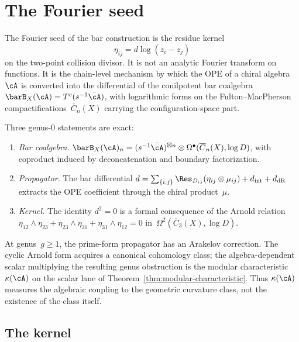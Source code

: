 \chapter{The Fourier seed}\label{ch:fourier-seed}



The Fourier seed of the bar construction is the residue kernel
\[
\eta_{ij}=d\log(z_i-z_j)
\]
on the two-point collision divisor. It is not an analytic Fourier
transform on functions. It is the chain-level mechanism by which the
OPE of a chiral algebra~$\cA$ is converted into the differential of
the conilpotent bar coalgebra
$\barB_X(\cA)=T^c(s^{-1}\bar\cA)$, with logarithmic forms on the
Fulton--MacPherson compactifications~$\overline{C}_n(X)$ carrying the
configuration-space part.

Three genus-$0$ statements are exact:
\begin{enumerate}[label=\textup{(\roman*)}]
\item \emph{Bar coalgebra.}
 $\barB_X(\cA)_n=(s^{-1}\bar\cA)^{\boxtimes n}\otimes
 \Omega^\bullet(\overline{C}_n(X),\log D)$, with coproduct induced by
 deconcatenation and boundary factorization.
\item \emph{Propagator.} The bar differential $d = \sum_{\{i,j\}}
 \Res_{D_{ij}}(\eta_{ij}\otimes\mu_{ij})+d_{\mathrm{int}}+
 d_{\mathrm{dR}}$ extracts the OPE coefficient through the chiral
 product~$\mu$.
\item \emph{Kernel.} The identity $d^2 = 0$ is a formal consequence
 of the Arnold relation
 $\eta_{12}\wedge\eta_{23} + \eta_{23}\wedge\eta_{31} +
 \eta_{31}\wedge\eta_{12} = 0$
 in~$\Omega^2(\overline{C}_3(X), \log D)$.
\end{enumerate}
At genus~$g \geq 1$, the prime-form propagator has an Arakelov
correction. The cyclic Arnold form acquires a canonical cohomology
class; the algebra-dependent scalar multiplying the resulting genus
obstruction is the modular characteristic~$\kappa(\cA)$ on the
scalar lane of Theorem~\ref{thm:modular-characteristic}. Thus
$\kappa(\cA)$ measures the algebraic coupling to the geometric
curvature class, not the existence of the class itself.

\section{The kernel}\label{sec:fourier-kernel}

